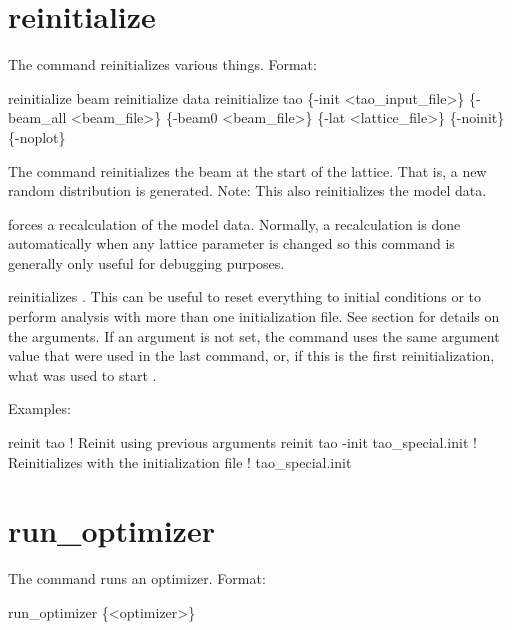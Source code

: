 \section{reinitialize}
\label{s:reinit}

The  command reinitializes various things. Format:
\begin{example}
  reinitialize beam
  reinitialize data
  reinitialize tao \{-init <tao_input_file>\} \{-beam_all <beam_file>\} 
     \{-beam0 <beam_file>\} \{-lat <lattice_file>\} \{-noinit\} \{-noplot\}
\end{example}

\vskip 0.2in 

The  command reinitializes the beam at the start
of the lattice. That is, a new random distribution is generated. 
Note: This also reinitializes the model data.

 forces a recalculation of the model data.
Normally, a recalculation is done automatically when any lattice
parameter is changed so this command is generally only useful for
debugging purposes.

 reinitializes \tao. This can be useful to reset
everything to initial conditions or to perform analysis with more than
one initialization file.  See section  for
details on the arguments.  If an argument is not set, the
 command uses the same argument value that were used in
the last  command, or, if this is the first
reinitialization, what was used to start \tao. 

Examples:
\begin{example}
  reinit tao                         ! Reinit using previous arguments
  reinit tao -init tao_special.init  ! Reinitializes \tao with the initialization file 
                                     !   tao_special.init
\end{example}


\section{run_optimizer}
\label{s:run}

The  command runs an optimizer. Format:
\begin{example}
  run_optimizer \{<optimizer>\}
\end{example}

